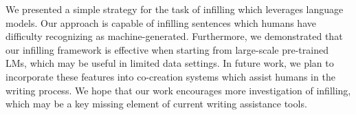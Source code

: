 We presented a simple strategy for the task of infilling which leverages language models. 
Our approach is capable of infilling sentences which humans have difficulty recognizing as machine-generated. 
Furthermore, 
we demonstrated that our infilling framework is effective when starting from large-scale pre-trained LMs, 
which may be useful in limited data settings. 
In future work, we plan to incorporate these features into co-creation systems which assist humans in the writing process. 
We hope that our work encourages more investigation of infilling, 
which may be a key missing element of current writing assistance tools.
